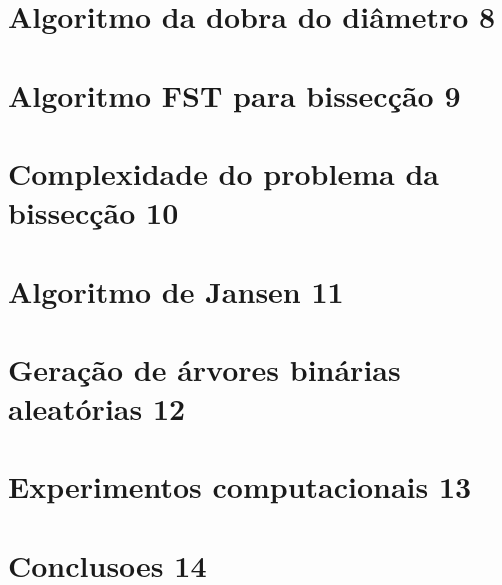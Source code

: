 \documentclass[a4paper,12pt]{article}
\begin{document}
\section {Algoritmo da dobra do diâmetro 8}


\section {Algoritmo FST para bissecção 9}



\section {Complexidade do problema da bissecção 10}



\section {Algoritmo de Jansen 11}



\section {Geração de árvores binárias aleatórias 12}



\section {Experimentos computacionais 13}



\section {Conclusoes 14}



\newpage


\end{document}
